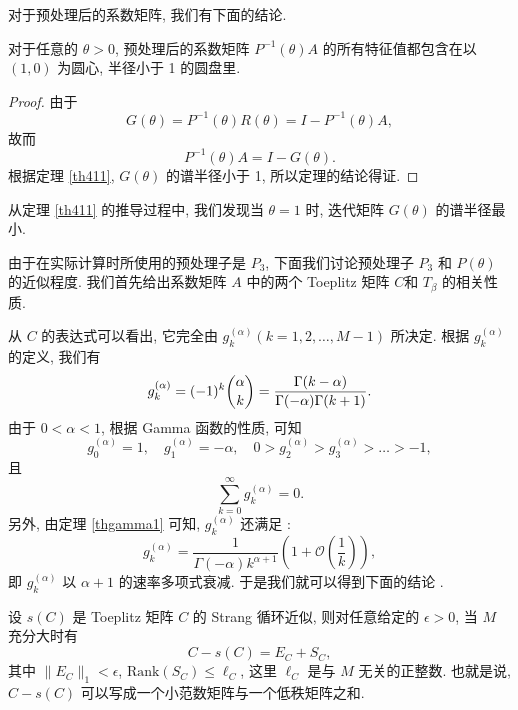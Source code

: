 \documentclass{ecnumaster}
\begin{document}
对于预处理后的系数矩阵, 我们有下面的结论.
\begin{theorem}
  对于任意的 $\theta > 0$,
  预处理后的系数矩阵 $P^{-1}(\theta)A$ 的所有特征值都包含在以 $(1, 0)$ 为圆心,
  半径小于 1 的圆盘里.
\end{theorem}
\begin{proof}
  由于
  \begin{equation} \nonumber
    G(\theta) = P^{-1}(\theta)R(\theta) = I - P^{-1}(\theta)A,
  \end{equation}
  故而
  \begin{equation} \nonumber
    P^{-1}(\theta)A = I - G(\theta).
  \end{equation}
  根据定理 \ref{th411}, $G(\theta)$ 的谱半径小于 1, 所以定理的结论得证.
\end{proof}

\begin{remark}
从定理 \ref{th411} 的推导过程中, 我们发现当 $\theta = 1$ 时, 迭代矩阵 $G(\theta)$ 的谱半径最小.
\end{remark}


由于在实际计算时所使用的预处理子是 $P_3$,
下面我们讨论预处理子 $P_3$ 和 $P(\theta)$ 的近似程度.
我们首先给出系数矩阵 $A$ 中的两个 Toeplitz 矩阵 $C$和 $T_{\beta}$ 的相关性质.

从 $C$ 的表达式可以看出, 它完全由 $g_k^{(\alpha)}(k = 1, 2, \dots, M-1)$ 所决定.
根据 $g_k^{(\alpha)}$ 的定义, 我们有
$$
  g_k^{(\alpha)} = (-1)^k \dbinom{\alpha}{k}
  = \frac{\Gamma (k- \alpha)}{\Gamma (-\alpha)\Gamma (k+1)}.
$$
由于 $0<\alpha<1$, 根据 Gamma 函数的性质, 可知 \cite{MT04}
$$
  g_0^{(\alpha)} = 1, \quad g_1^{(\alpha)} = -\alpha, 
  \quad 0 > g_2^{(\alpha)} > g_3^{(\alpha)} > \dots > -1,
$$
且
\begin{equation}\label{eq430}
    \sum _{k=0}^{\infty} g_k^{(\alpha)} = 0.
\end{equation}
另外, 由定理 \ref{thgamma1} 可知, $g_k^{(\alpha)}$ 还满足 \cite{WWS10}:
$$
  g_k^{(\alpha)} =
  \frac{1}{\Gamma(-\alpha) k^{\alpha + 1}} \left( 1 + \mathcal{O} \left( \frac{1}{k}\right)\right),
$$
即 $g_k^{(\alpha)}$ 以 $\alpha + 1$ 的速率多项式衰减.
于是我们就可以得到下面的结论 \cite{CS89}.

\begin{theorem}\label{Th:s-C}
  设 $s(C)$ 是 Toeplitz 矩阵 $C$ 的 Strang 循环近似, 
  则对任意给定的 $\epsilon>0$, 当 $M$ 充分大时有 
  $$C - s(C) = E_C + S_C,$$
  其中 $\|E_C\|_1<\epsilon$, $\mathrm{Rank}(S_C)\leq\ell_C$, 
  这里 $\ell_C$ 是与 $M$ 无关的正整数. 
  也就是说, $C - s(C)$ 可以写成一个小范数矩阵与一个低秩矩阵之和.
\end{theorem}
  
\end{document}
